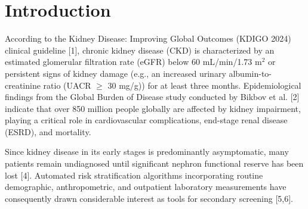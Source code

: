 \documentclass[runningheads]{llncs}
\begin{document}
\section{Introduction}
According to the Kidney Disease: Improving Global Outcomes (KDIGO 2024) clinical guideline [1], chronic kidney disease (CKD) is characterized by an estimated glomerular filtration rate (eGFR) below 60 mL/min/1.73 m$^2$ or persistent signs of kidney damage (e.g., an increased urinary albumin-to-creatinine ratio (UACR $\ge$ 30 mg/g)) for at least three months. Epidemiological findings from the Global Burden of Disease study conducted by Bikbov et al. [2] indicate that over 850 million people globally are affected by kidney impairment, playing a critical role in cardiovascular complications, end-stage renal disease (ESRD), and mortality.

Since kidney disease in its early stages is predominantly asymptomatic, many patients remain undiagnosed until significant nephron functional reserve has been lost [4]. Automated risk stratification algorithms incorporating routine demographic, anthropometric, and outpatient laboratory measurements have consequently drawn considerable interest as tools for secondary screening [5,6].
\end{document}
